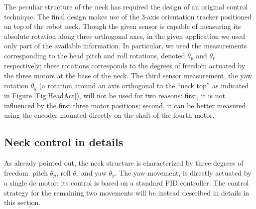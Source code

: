 \documentclass[conference]{IEEEtran}
\numberwithin{equation}{section}
\begin{document}
The peculiar structure of the neck has required the design of an original control technique. The final design makes use of the 3-axis orientation tracker positioned on top of the robot neck. Though the given sensor is capable of measuring its absolute rotation along three orthogonal axes, in the given application we used only part of the available information. In particular, we used the measurements corresponding to the head pitch and roll rotations, denoted $\theta_p$ and $\theta_r$ respectively; these rotations corresponds to the degrees of freedom actuated by the three motors at the base of the neck. The third sensor measurement, the yaw rotation $\theta_y$ (a rotation around an axis orthogonal to the ``neck top'' as indicated in Figure \ref{Fig:HeadAct}), will not be used for two reasons: first, it is not influenced by the first three motor positions; second, it can be better measured using the encoder mounted directly on the shaft of the fourth motor.

\subsection{Neck control in details} \label{Sec:NeckControlInDetails}

As already pointed out, the neck structure is characterized by three degrees of freedom: pitch $\theta_p$, roll $\theta_r$ and yaw $\theta_y$. The yaw movement, is directly actuated by a single dc motor; its control is based on a standard PID controller. The control strategy for the remaining two movements will be instead described in details in this section.
\end{document}
